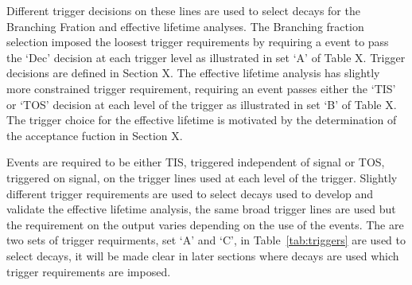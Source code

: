 Different trigger decisions on these lines are used to select decays for the Branching Fration and effective lifetime analyses. The Branching fraction selection imposed the loosest trigger requirements by requiring a event to pass the `Dec' decision at each trigger level as illustrated in set `A' of Table X. Trigger decisions are defined in Section X. The effective lifetime analysis has slightly more constrained trigger requirement, requiring an event passes either the `TIS' or `TOS' decision at each level of the trigger as illustrated in set `B' of Table X. The trigger choice for the effective lifetime is motivated by the determination of the acceptance fuction in Section X. 

Events are required to be either TIS, triggered independent of signal or TOS, triggered on signal, on the trigger lines used at each level of the trigger.
Slightly different trigger requirements are used to select \bhh decays used to develop and validate the effective lifetime analysis, the same broad trigger lines are used but the requirement on the output varies depending on the use of the \bhh events. The are two sets of trigger requirments, set `A' and `C', in Table~\ref{tab:triggers} are used to select \bhh decays, it will be made clear in later sections where \bhh decays are used which trigger requirements are imposed. 

